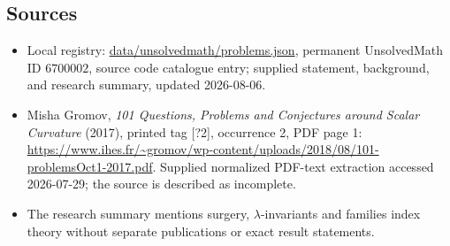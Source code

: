 \documentclass[11pt]{article}
\begin{document}
\subsection{Sources}
\begin{itemize}
\item Local registry: \url{data/unsolvedmath/problems.json}, permanent UnsolvedMath ID \(6700002\), source code catalogue entry; supplied statement, background, and research summary, updated 2026-08-06.
\item Misha Gromov, \emph{101 Questions, Problems and Conjectures around Scalar Curvature} (2017), printed tag [?2], occurrence 2, PDF page 1: \url{https://www.ihes.fr/~gromov/wp-content/uploads/2018/08/101-problemsOct1-2017.pdf}. Supplied normalized PDF-text extraction accessed 2026-07-29; the source is described as incomplete.
\item The research summary mentions surgery, \(\lambda\)-invariants and families index theory without separate publications or exact result statements.
\end{itemize}
\end{document}
